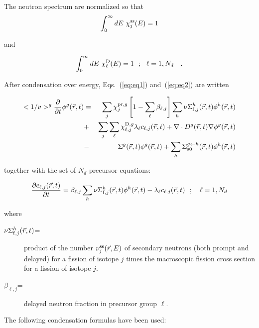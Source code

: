 \vskip 0.2cm

The neutron spectrum are normalized so that
\begin{equation}
\int_0^\infty dE \ \chi_j^{\rm ss}(E)=1
\end{equation}

\noindent and

\begin{equation}
\int_0^\infty dE \ \chi_\ell^{\rm D}(E)=1 \ \ ; \ \ \ell=1,N_d \ \ \ .
\end{equation}

\vskip 0.2cm

After condensation over energy, Eqs.~(\ref{eq:eq1}) and~(\ref{eq:eq2}) are
written

\begin{eqnarray}
\nonumber <1/v>^g{\partial\over \partial t}\phi^g(\vec r,t) &=& \sum_j
\chi_j^{{\rm pr},g}
\left[1-\sum_\ell\beta_{\ell,j}\right]\sum_h \nu\Sigma_{{\rm f},j}^h(\vec r,t) \phi^h(\vec r,t)\\
\nonumber &+&\sum_j \sum_\ell\chi_{\ell,j}^{{\rm D},g}\lambda_\ell c_{\ell,j}(\vec r,t) + \nabla \cdot D^g(\vec r,t)
\nabla\phi^g(\vec r,t)\\
&-& \Sigma^g(\vec r,t) \phi^g(\vec r,t) +
\sum_h \Sigma_{\rm s0}^{g \leftarrow h}(\vec r,t)
\phi^h(\vec r,t)
\label{eq:eq7}
\end{eqnarray}

\noindent together with the set of $N_d$ precursor equations:

\begin{equation}
{\partial c_{\ell,j}(\vec r,t) \over \partial t}=\beta_{\ell,j} \sum_h
\nu\Sigma_{{\rm f},j}^h(\vec r,t) \phi^h(\vec r,t)-\lambda_\ell c_{\ell,j}(\vec r,t) \ \ ; \ \ \
\ell=1,N_d
\label{eq:eq8}
\end{equation}

\noindent where
\begin{description}
\item [$\nu\Sigma_{{\rm f},j}^h(\vec r,t)$=] product of the number $\nu_j^{\rm ss}(\vec r,E)$ of secondary neutrons
(both prompt and delayed) for a fission of isotope $j$ times the macroscopic fission cross
section for a fission of isotope $j$.
\item [$\beta_{\ell,j}$=] delayed neutron fraction in precursor group $\ell$.
\end{description}

\vskip 0.2cm

The following condensation formulas have been used:

